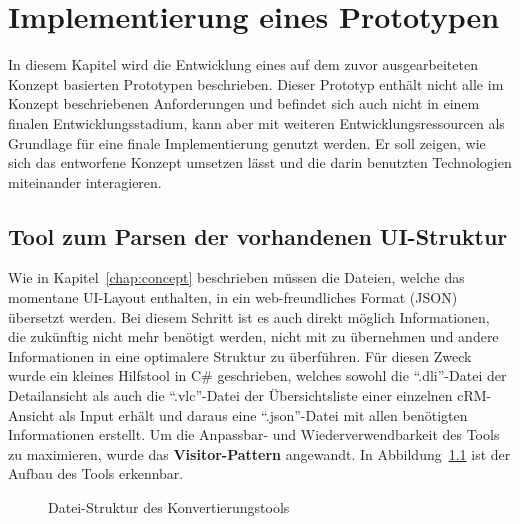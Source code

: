 \chapter{Implementierung eines Prototypen}\label{chap:implementation}
In diesem Kapitel wird die Entwicklung eines auf dem zuvor ausgearbeiteten Konzept basierten Prototypen beschrieben. Dieser Prototyp enthält nicht alle im Konzept beschriebenen Anforderungen und befindet sich auch nicht in einem finalen Entwicklungsstadium, kann aber mit weiteren Entwicklungsressourcen als Grundlage für eine finale Implementierung genutzt werden. Er soll zeigen, wie sich das entworfene Konzept umsetzen lässt und die darin benutzten Technologien miteinander interagieren. \\

\section{Tool zum Parsen der vorhandenen UI-Struktur}
Wie in Kapitel~\ref{chap:concept} beschrieben müssen die Dateien, welche das momentane UI-Layout enthalten, in ein web-freundliches Format (JSON) übersetzt werden. Bei diesem Schritt ist es auch direkt möglich Informationen, die zukünftig nicht mehr benötigt werden, nicht mit zu übernehmen und andere Informationen in eine optimalere Struktur zu überführen. Für diesen Zweck wurde ein kleines Hilfstool in C\# geschrieben, welches sowohl die ``.dli''-Datei der Detailansicht als auch die ``.vlc''-Datei der Übersichtsliste einer einzelnen cRM-Ansicht als Input erhält und daraus eine ``.json''-Datei mit allen benötigten Informationen erstellt. Um die Anpassbar- und Wiederverwendbarkeit des Tools zu maximieren, wurde das \textbf{Visitor-Pattern} angewandt. In Abbildung~\ref{fig:web-conv_file-tree} ist der Aufbau des Tools erkennbar.

\begin{figure}
    \centering
    \captionsetup{justification=centering}
        \caption{Datei-Struktur des Konvertierungstools}\label{fig:web-conv_file-tree}
\end{figure}

